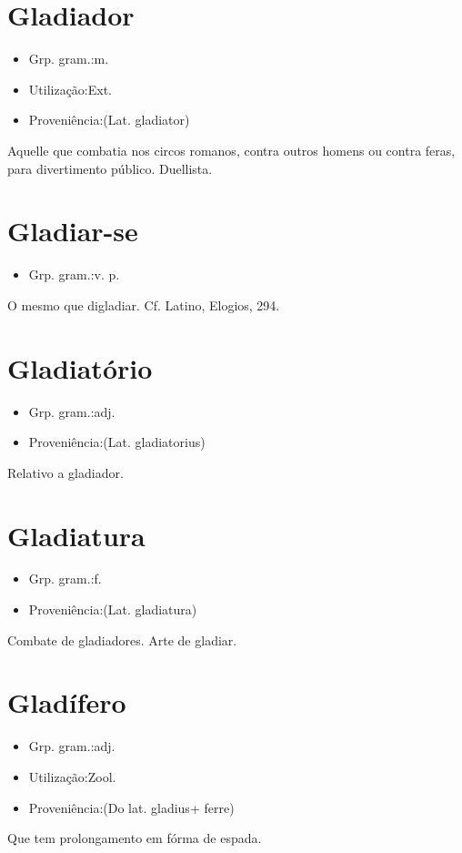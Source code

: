 \section{Gladiador}
\begin{itemize}
\item {Grp. gram.:m.}
\end{itemize}
\begin{itemize}
\item {Utilização:Ext.}
\end{itemize}
\begin{itemize}
\item {Proveniência:(Lat. \textunderscore gladiator\textunderscore )}
\end{itemize}
Aquelle que combatia nos circos romanos, contra outros homens ou contra feras, para divertimento público.
Duellista.
\section{Gladiar-se}
\begin{itemize}
\item {Grp. gram.:v. p.}
\end{itemize}
O mesmo que \textunderscore digladiar\textunderscore . Cf. Latino, \textunderscore Elogios\textunderscore , 294.
\section{Gladiatório}
\begin{itemize}
\item {Grp. gram.:adj.}
\end{itemize}
\begin{itemize}
\item {Proveniência:(Lat. \textunderscore gladiatorius\textunderscore )}
\end{itemize}
Relativo a gladiador.
\section{Gladiatura}
\begin{itemize}
\item {Grp. gram.:f.}
\end{itemize}
\begin{itemize}
\item {Proveniência:(Lat. \textunderscore gladiatura\textunderscore )}
\end{itemize}
Combate de gladiadores.
Arte de gladiar.
\section{Gladífero}
\begin{itemize}
\item {Grp. gram.:adj.}
\end{itemize}
\begin{itemize}
\item {Utilização:Zool.}
\end{itemize}
\begin{itemize}
\item {Proveniência:(Do lat. \textunderscore gladius\textunderscore  + \textunderscore ferre\textunderscore )}
\end{itemize}
Que tem prolongamento em fórma de espada.
